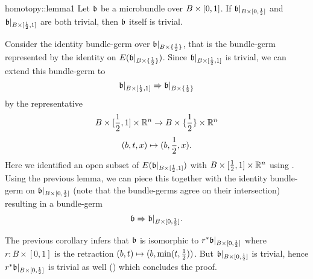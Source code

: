 \begin{scope}
    \newcommand{\bbleft} {
        \bb\restr{B \times{} [0, \half]}
    }
    \newcommand{\bbright} {
        \bb\restr{B \times{} [\half, 1]}
    }
    \newcommand{\bbhalf} {
        \bb\restr{B \times{} \coll{\half{}}}
    }

    \begin{mylemma}{homotopy::lemma1}
        Let $\mathfrak{b}$ be a microbundle over $B \times{} [0, 1]$. If $\bbleft$ and $\bbright$ are both trivial,
        then $\mathfrak{b}$ itself is trivial.
    \end{mylemma}

    \begin{myproof}
        Consider the identity bundle-germ over $\bbhalf$, that is the bundle-germ represented by the identity on $E(\bbhalf)$.
        Since $\bbright$ is trivial, we can extend this bundle-germ to 
        \[ \germ{\bbright}{\bbhalf} \]
        by the representative
        \[ B \times [\frac{1}{2}, 1] \times \mathbb{R}^n \to B \times \{\frac{1}{2}\} \times \mathbb{R}^n \]
        \[ (b, t, x) \mapsto (b, \frac{1}{2}, x). \]
        Here we identified an open subset of $E(\mathfrak{b}\vert_{B \times [\frac{1}{2}, 1]})$ with $B \times [\frac{1}{2}, 1] \times \mathbb{R}^n$ using .
        Using the previous lemma, we can piece this together with the identity bundle-germ on $\bbleft$ (note that the bundle-germs agree on their intersection) resulting in a bundle-germ
        \[ \germ{\bb}{\bbleft}. \]

        The previous corollary infers that $\mathfrak{b}$ is isomorphic to $\ind{r}\bbleft$ where $r: B \times [0, 1]$ is the retraction $(b, t) \mapsto (b, \min(t, \frac{1}{2}))$.
        But $\bbleft$ is trivial, hence $\ind{r}\bbleft$ is trivial as well () which concludes the proof.
    \end{myproof}
\end{scope}